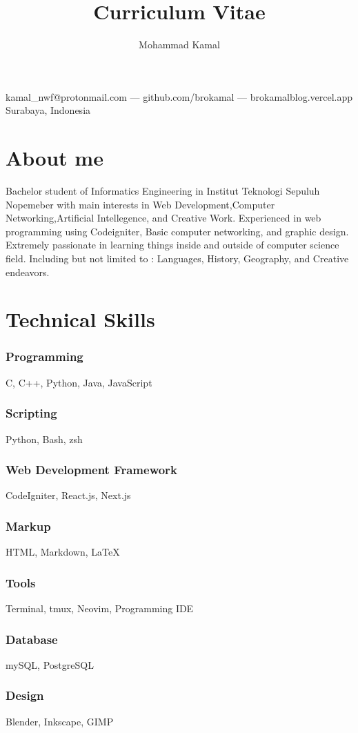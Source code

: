 \documentclass{article}
\makeatletter
\renewcommand{\maketitle}{
\begin{center}
{\huge\bfseries
\theauthor}




\vspace{.25em}

kamal\_nwf@protonmail.com --- github.com/brokamal --- brokamalblog.vercel.app\\
Surabaya, Indonesia 

\end{center}

}
\makeatother
\begin{document}
\title{Curriculum Vitae}
\author{Mohammad Kamal}

\maketitle

\section{About me}
Bachelor student of Informatics Engineering in Institut Teknologi Sepuluh Nopemeber with main interests in Web Development,Computer Networking,Artificial Intellegence, and Creative Work. Experienced in web programming using Codeigniter, Basic computer networking, and graphic design. 
\\[1em]
Extremely passionate in learning things inside and outside of computer science field. Including but not limited to : Languages, History, Geography, and Creative endeavors. 
\section{Technical Skills}



\subsubsection{Programming}
C, C++, Python, Java, JavaScript
\subsubsection{Scripting}
Python, Bash, zsh
\subsubsection{Web Development Framework}
CodeIgniter, React.js, Next.js
\subsubsection{Markup}
HTML, Markdown, LaTeX
\subsubsection{Tools}
Terminal, tmux, Neovim, Programming IDE
\subsubsection{Database}
mySQL, PostgreSQL
\subsubsection{Design}
Blender, Inkscape, GIMP
\end{document}
